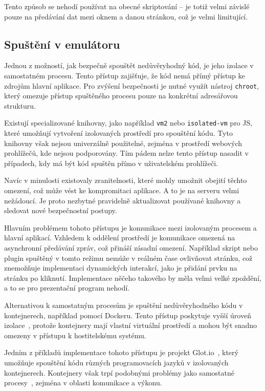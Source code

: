Tento způsob se nehodí používat na obecné skriptování -- je totiž velmi závislé pouze na předávání dat mezi oknem a danou stránkou, což je velmi limitující.

\subsection{Spuštění v emulátoru}

Jednou z možností, jak bezpečně spouštět nedůvěryhodný kód, je jeho izolace v samostatném procesu. 
Tento přístup zajišťuje, že kód nemá přímý přístup ke zdrojům hlavní aplikace. 
Pro zvýšení bezpečnosti je nutné využít nástroj \texttt{chroot}, který omezuje přístup spuštěného procesu pouze na konkrétní adresářovou strukturu.

Existují specializované knihovny, jako například \texttt{vm2} nebo \texttt{isolated-vm} pro JS, které umožňují vytvoření izolovaných prostředí pro spouštění kódu. 
Tyto knihovny však nejsou univerzálně použitelné, zejména v prostředí webových prohlížečů, kde nejsou podporovány. 
Tím pádem nelze tento přístup nasadit v případech, kdy má být kód spuštěn přímo v uživatelském prohlížeči.

Navíc v minulosti existovaly zranitelnosti, které mohly umožnit obejití těchto omezení, což může vést ke kompromitaci aplikace.
A to je na serveru velmi nežádoucí.
Je proto nezbytné pravidelně aktualizovat používané knihovny a sledovat nové bezpečnostní postupy.

Hlavním problémem tohoto přístupu je komunikace mezi izolovaným procesem a hlavní aplikací. 
Vzhledem k oddělení prostředí je komunikace omezená na asynchronní předávání zpráv, což přináší zásadní omezení. 
Například skript nebo plugin spuštěný v tomto režimu nemůže v reálném čase ovlivňovat stránku, což znemožňuje implementaci dynamických interakcí, jako je přidání prvku na stránku po kliknutí. 
Implementace něčeho takového by měla velmi velké zpoždění, a to se pro prezentační program nehodí.

Alternativou k samostatným procesům je spuštění nedůvěryhodného kódu v kontejnerech, například pomocí Dockeru. 
Tento přístup poskytuje vyšší úroveň izolace~\cite{docker}, protože kontejnery mají vlastní virtuální prostředí a mohou být snadno omezeny v přístupu k hostitelskému systému.

Jedním z příkladů implementace tohoto přístupu je projekt Glot.io~\cite{glotio}, který umožňuje spouštění kódu různých programovacích jazyků v izolovaných kontejnerech. 
Kontejnery však trpí podobnými problémy jako samostatné procesy~\cite{glotio}, zejména v oblasti komunikace a výkonu. 

